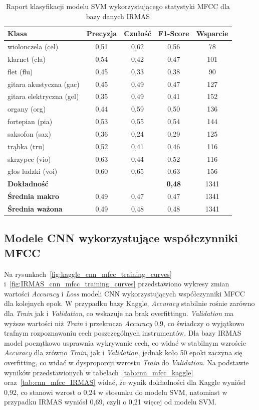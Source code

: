 \documentclass{SGGW-thesis}
\begin{document}
\begin{table}[H]
\centering
\caption{Raport klasyfikacji modelu SVM wykorzystującego statystyki MFCC dla bazy danych IRMAS}
\label{tab:svm_mfcc_IRMAS}
\begin{tabular}{lcccc}
\toprule
\textbf{Klasa} & \textbf{Precyzja} & \textbf{Czułość} & \textbf{F1-Score} & \textbf{Wsparcie} \\
\midrule
wiolonczela (cel) & 0,51 & 0,62 & 0,56 & 78 \\
klarnet (cla) & 0,54 & 0,42 & 0,47 & 101 \\
flet (flu) & 0,45 & 0,33 & 0,38 & 90 \\
gitara akustyczna (gac) & 0,45 & 0,49 & 0,47 & 127 \\
gitara elektryczna (gel) & 0,35 & 0,49 & 0,41 & 152 \\
organy (org) & 0,44 & 0,59 & 0,50 & 136 \\
fortepian (pia) & 0,53 & 0,55 & 0,54 & 144 \\
saksofon (sax) & 0,36 & 0,24 & 0,29 & 125 \\
trąbka (tru) & 0,52 & 0,41 & 0,46 & 116 \\
skrzypce (vio) & 0,63 & 0,44 & 0,52 & 116 \\
głos ludzki (voi) & 0,60 & 0,65 & 0,63 & 156 \\
\midrule
\textbf{Dokładność} & & & \textbf{0,48} & 1341 \\
\textbf{Średnia makro} & 0,49 & 0,47 & 0,47 & 1341 \\
\textbf{Średnia ważona} & 0,49 & 0,48 & 0,48 & 1341 \\
\bottomrule
\end{tabular}
\end{table}

\subsection{Modele CNN wykorzystujące współczynniki MFCC}
Na rysunkach~\ref{fig:kaggle_cnn_mfcc_training_curves} i~\ref{fig:IRMAS_cnn_mfcc_training_curves} przedstawiono wykresy zmian wartości \textit{Accuracy} i \textit{Loss} modeli CNN wykorzystujących współczynniki MFCC dla kolejnych epok. W przypadku bazy Kaggle, \textit{Accuracy} stabilnie rośnie zarówno dla \textit{Train} jak i \textit{Validation}, co wskazuje na brak overfittingu. \textit{Validation} ma wyższe wartości niż \textit{Train} i przekrocza \textit{Accuracy} 0,9, co świadczy o wyjątkowo trafnym rozpoznawaniu cech poszczególnych instrumentów. Dla bazy IRMAS model początkowo usprawnia wykrywanie cech, co widać w stabilnym wzroście \textit{Accuracy} dla zrówno \textit{Train}, jak i \textit{Validation}, jednak koło 50 epoki zaczyna się overfitting, co widać w dysproporcji wzrostu \textit{Train} do \textit{Validation}. Na podstawie wyników przedstawionych w tabelach~\ref{tab:cnn_mfcc_kaggle} oraz~\ref{tab:cnn_mfcc_IRMAS} widać, że wynik dokładności dla Kaggle wyniósł 0,92, co stanowi wzrost o 0,24 w stosunku do modelu SVM, natomiast w przypadku IRMAS wyniósł 0,69, czyli o 0,21 więcej od modelu SVM.
\end{document}
